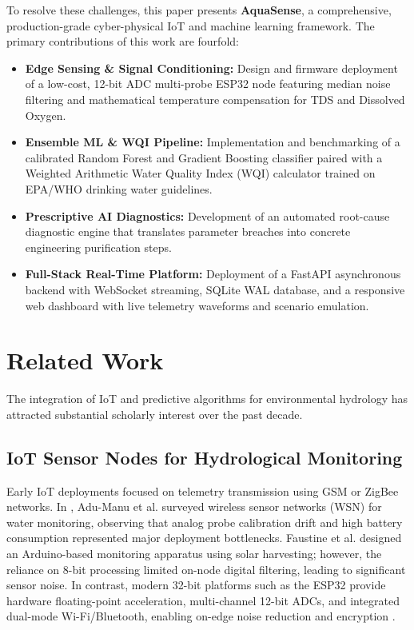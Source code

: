 \documentclass[conference]{IEEEtran}
\begin{document}
To resolve these challenges, this paper presents \textbf{AquaSense}, a comprehensive, production-grade cyber-physical IoT and machine learning framework. The primary contributions of this work are fourfold:
\begin{itemize}
    \item \textbf{Edge Sensing \& Signal Conditioning:} Design and firmware deployment of a low-cost, 12-bit ADC multi-probe ESP32 node featuring median noise filtering and mathematical temperature compensation for TDS and Dissolved Oxygen.
    \item \textbf{Ensemble ML \& WQI Pipeline:} Implementation and benchmarking of a calibrated Random Forest and Gradient Boosting classifier paired with a Weighted Arithmetic Water Quality Index (WQI) calculator trained on EPA/WHO drinking water guidelines.
    \item \textbf{Prescriptive AI Diagnostics:} Development of an automated root-cause diagnostic engine that translates parameter breaches into concrete engineering purification steps.
    \item \textbf{Full-Stack Real-Time Platform:} Deployment of a FastAPI asynchronous backend with WebSocket streaming, SQLite WAL database, and a responsive web dashboard with live telemetry waveforms and scenario emulation.
\end{itemize}

\section{Related Work}
The integration of IoT and predictive algorithms for environmental hydrology has attracted substantial scholarly interest over the past decade.

\subsection{IoT Sensor Nodes for Hydrological Monitoring}
Early IoT deployments focused on telemetry transmission using GSM or ZigBee networks. In \cite{adumanu2017}, Adu-Manu et al. surveyed wireless sensor networks (WSN) for water monitoring, observing that analog probe calibration drift and high battery consumption represented major deployment bottlenecks. Faustine et al. \cite{faustine2014} designed an Arduino-based monitoring apparatus using solar harvesting; however, the reliance on 8-bit processing limited on-node digital filtering, leading to significant sensor noise. In contrast, modern 32-bit platforms such as the ESP32 provide hardware floating-point acceleration, multi-channel 12-bit ADCs, and integrated dual-mode Wi-Fi/Bluetooth, enabling on-edge noise reduction and encryption \cite{esp32ref}.
\end{document}
